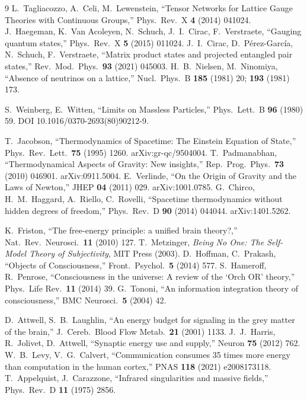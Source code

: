 \documentclass[12pt,a4paper,twoside]{article}
\theoremstyle{plain}
\theoremstyle{definition}
\theoremstyle{remark}
\begin{document}
\begin{thebibliography}{9}
L.~Tagliacozzo, A.~Celi, M.~Lewenstein, ``Tensor Networks for Lattice Gauge Theories with Continuous Groups,'' Phys.\ Rev.\ X \textbf{4} (2014) 041024.
J.~Haegeman, K.~Van Acoleyen, N.~Schuch, J.~I.~Cirac, F.~Verstraete, ``Gauging quantum states,'' Phys.\ Rev.\ X \textbf{5} (2015) 011024.
J.~I.~Cirac, D.~P\'erez-Garc\'ia, N.~Schuch, F.~Verstraete, ``Matrix product states and projected entangled pair states,'' Rev.\ Mod.\ Phys.\ \textbf{93} (2021) 045003.
H.~B.~Nielsen, M.~Ninomiya, ``Absence of neutrinos on a lattice,'' Nucl.\ Phys.\ B \textbf{185} (1981) 20; \textbf{193} (1981) 173.

S.~Weinberg, E.~Witten, ``Limits on Massless Particles,'' Phys.\ Lett.\ B \textbf{96} (1980) 59. DOI 10.1016/0370-2693(80)90212-9.

T.~Jacobson, ``Thermodynamics of Spacetime: The Einstein Equation of State,'' Phys.\ Rev.\ Lett.\ \textbf{75} (1995) 1260. arXiv:gr-qc/9504004.
T.~Padmanabhan, ``Thermodynamical Aspects of Gravity: New insights,'' Rep.\ Prog.\ Phys.\ \textbf{73} (2010) 046901. arXiv:0911.5004.
E.~Verlinde, ``On the Origin of Gravity and the Laws of Newton,'' JHEP \textbf{04} (2011) 029. arXiv:1001.0785.
G.~Chirco, H.~M.~Haggard, A.~Riello, C.~Rovelli, ``Spacetime thermodynamics without hidden degrees of freedom,'' Phys.\ Rev.\ D \textbf{90} (2014) 044044. arXiv:1401.5262.

K.~Friston, ``The free-energy principle: a unified brain theory?,'' Nat.\ Rev.\ Neurosci.\ \textbf{11} (2010) 127.
T.~Metzinger, \textit{Being No One: The Self-Model Theory of Subjectivity}, MIT Press (2003).
D.~Hoffman, C.~Prakash, ``Objects of Consciousness,'' Front.\ Psychol.\ \textbf{5} (2014) 577.
S.~Hameroff, R.~Penrose, ``Consciousness in the universe: A review of the `Orch OR' theory,'' Phys.\ Life Rev.\ \textbf{11} (2014) 39.
G.~Tononi, ``An information integration theory of consciousness,'' BMC Neurosci.\ \textbf{5} (2004) 42.

D.~Attwell, S.~B.~Laughlin, ``An energy budget for signaling in the grey matter of the brain,'' J.\ Cereb.\ Blood Flow Metab.\ \textbf{21} (2001) 1133.
J.~J.~Harris, R.~Jolivet, D.~Attwell, ``Synaptic energy use and supply,'' Neuron \textbf{75} (2012) 762.
W.~B.~Levy, V.~G.~Calvert, ``Communication consumes 35 times more energy than computation in the human cortex,'' PNAS \textbf{118} (2021) e2008173118.
T.~Appelquist, J.~Carazzone, ``Infrared singularities and massive fields,'' Phys.\ Rev.\ D \textbf{11} (1975) 2856.


\end{thebibliography}
\end{document}
